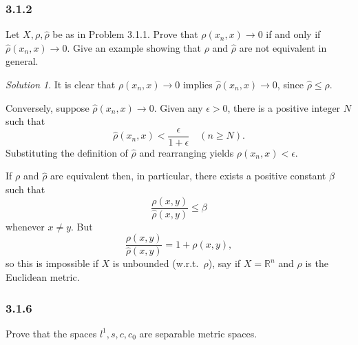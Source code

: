 \documentclass{report}
\newcommand{\bb}[1]{\mathbb{#1}}
\theoremstyle{remark}
\newtheorem*{solution}{Solution}
\begin{document}
\subsubsection*{3.1.2}
Let $X, \rho, \hat \rho$ be as in Problem 3.1.1. Prove that $\rho(x_n, x) \to 0$ if and only if $\hat \rho(x_n, x) \to 0$. Give an example showing that $\rho$ and $\hat \rho$ are not equivalent in general.

\begin{solution}
  It is clear that $\rho(x_n, x) \to 0$ implies $\hat \rho (x_n, x) \to 0$, since $\hat \rho \le \rho$.
  
  Conversely, suppose $\hat \rho(x_n, x) \to 0$. Given any $\epsilon > 0$, there is a positive integer $N$ such that
  \begin{equation*}
    \hat \rho(x_n, x) < \frac{\epsilon}{1 + \epsilon} \quad (n \ge N).
  \end{equation*}
  Substituting the definition of $\hat \rho$ and rearranging yields $\rho(x_n, x) < \epsilon$.

  If $\rho$ and $\hat \rho$ are equivalent then, in particular, there exists a positive constant $\beta$ such that
  \begin{equation*}
    \frac{\rho(x,y)}{\hat \rho(x,y)} \le \beta
  \end{equation*}
  whenever $x \ne y$. But
  \begin{equation*}
    \frac{\rho(x,y)}{\hat \rho(x,y)} = 1 + \rho(x,y),
  \end{equation*}
  so this is impossible if $X$ is unbounded (w.r.t.\ $\rho$), say if $X = \bb R^n$ and $\rho$ is the Euclidean metric.
\end{solution}

\subsubsection*{3.1.6}
Prove that the spaces $l^1, s, c, c_0$ are separable metric spaces.
\end{document}
